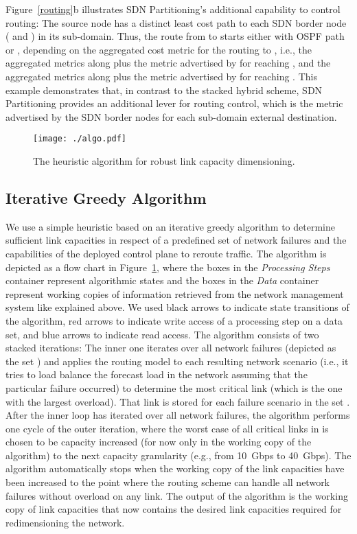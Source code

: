 \documentclass[10pt, conference]{IEEEtran}
\begin{document}
Figure~\ref{routing}b illustrates SDN Partitioning's additional capability to control routing: The source node  has a distinct least cost path to each SDN border node ( and ) in its sub-domain. Thus, the route from  to  starts either with OSPF path  or , depending on the aggregated cost metric for the routing to , i.e., the aggregated metrics along  plus the metric advertised by  for reaching , and the aggregated metrics along  plus the metric advertised by  for reaching . This example demonstrates that, in contrast to the stacked hybrid scheme, SDN Partitioning provides an additional lever for routing control, which is the metric advertised by the SDN border nodes for each sub-domain external destination.

\begin{figure}[b!] \center
\texttt{[image: ./algo.pdf]}
\caption{The heuristic algorithm for robust link capacity dimensioning.}
\label{algo} \end{figure}

\subsection{Iterative Greedy Algorithm}\label{algo_subsec}
We use a simple heuristic based on an iterative greedy algorithm to determine sufficient link capacities in respect of a predefined set of network failures and the capabilities of the deployed control plane to reroute traffic. The algorithm is depicted as a flow chart in Figure~\ref{algo}, where the boxes in the \emph{Processing Steps} container represent algorithmic states and the boxes in the \emph{Data} container represent working copies of information retrieved from the network management system like explained above. We used black arrows to indicate state transitions of the algorithm, red arrows to indicate write access of a processing step on a data set, and blue arrows to indicate read access. The algorithm consists of two stacked iterations: The inner one iterates over all network failures (depicted as the set ) and applies the routing model to each resulting network scenario (i.e., it tries to load balance the forecast load in the network assuming that the particular failure occurred) to determine the most critical link (which is the one with the largest overload). That link is stored for each failure scenario in the set . After the inner loop has iterated over all network failures, the algorithm performs one cycle of the outer iteration, where the worst case of all critical links in  is chosen to be capacity increased (for now only in the working copy of the algorithm) to the next capacity granularity (e.g., from 10~Gbps to 40~Gbps). The algorithm automatically stops when the working copy of the link capacities have been increased to the point where the routing scheme can handle all network failures without overload on any link. The output of the algorithm is the working copy of link capacities that now contains the desired link capacities required for redimensioning the network.
\end{document}
